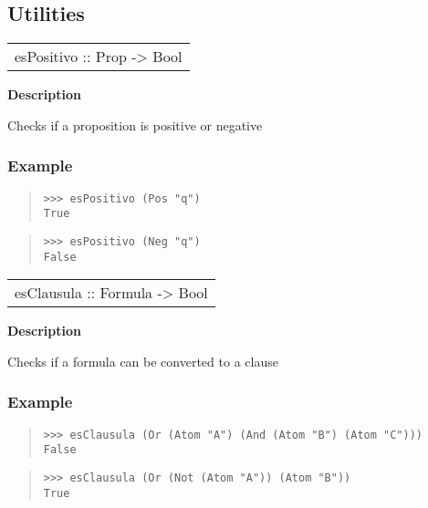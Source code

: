 \subsection{Utilities}
\begin{haddockdesc}
\item[\begin{tabular}{@{}l}
esPositivo :: Prop -> Bool
\end{tabular}]
{\haddockbegindoc
\textbf{Description}\par
Checks if a proposition is positive or negative\par
\subsubsection*{\textbf{Example}}
\begin{quote}
{\haddockverb\begin{verbatim}
>>> esPositivo (Pos "q")
True

\end{verbatim}}
\end{quote}
\begin{quote}
{\haddockverb\begin{verbatim}
>>> esPositivo (Neg "q")
False

\end{verbatim}}
\end{quote}}
\end{haddockdesc}
\begin{haddockdesc}
\item[\begin{tabular}{@{}l}
esClausula :: Formula -> Bool
\end{tabular}]
{\haddockbegindoc
\textbf{Description}\par
Checks if a formula can be converted to a clause\par
\subsubsection*{\textbf{Example}}
\begin{quote}
{\haddockverb\begin{verbatim}
>>> esClausula (Or (Atom "A") (And (Atom "B") (Atom "C")))
False

\end{verbatim}}
\end{quote}
\begin{quote}
{\haddockverb\begin{verbatim}
>>> esClausula (Or (Not (Atom "A")) (Atom "B"))
True

\end{verbatim}}
\end{quote}}
\end{haddockdesc}
